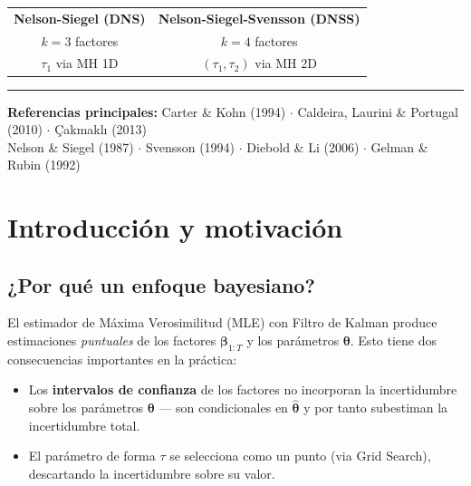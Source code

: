 \documentclass[12pt, a4paper]{article}
\theoremstyle{plain}
\theoremstyle{definition}
\theoremstyle{remark}
\newcommand{\bbet}{\bm{\beta}}
\begin{document}
\begin{titlepage}
\begin{center}
\begin{tabular}{cc}
  \textbf{Nelson-Siegel (DNS)} & \textbf{Nelson-Siegel-Svensson (DNSS)} \\[4pt]
  $k = 3$ factores & $k = 4$ factores \\[2pt]
  $\tau_1$ via MH 1D & $(\tau_1, \tau_2)$ via MH 2D \\
\end{tabular}

\vspace{2cm}
\rule{\textwidth}{0.4pt}
\vspace{0.5cm}

{\small\sffamily\color{azulclaro}
  \textbf{Referencias principales:} Carter \& Kohn (1994) $\cdot$
  Caldeira, Laurini \& Portugal (2010) $\cdot$ Çakmaklı (2013) \\
  Nelson \& Siegel (1987) $\cdot$ Svensson (1994) $\cdot$
  Diebold \& Li (2006) $\cdot$ Gelman \& Rubin (1992)
}
\end{center}
\end{titlepage}

\nopagecolor
\color{black}

\tableofcontents
\newpage

\section{Introducción y motivación}

\subsection{¿Por qué un enfoque bayesiano?}

El estimador de Máxima Verosimilitud (MLE) con Filtro de Kalman produce estimaciones
\emph{puntuales} de los factores $\bbet_{1:T}$ y los parámetros $\bm{\theta}$.
Esto tiene dos consecuencias importantes en la práctica:

\begin{itemize}[leftmargin=1.5em]
  \item Los \textbf{intervalos de confianza} de los factores no incorporan la
        incertidumbre sobre los parámetros $\bm{\theta}$ — son condicionales en
        $\hat{\bm{\theta}}$ y por tanto subestiman la incertidumbre total.
  \item El parámetro de forma $\tau$ se selecciona como un punto
        (via Grid Search), descartando la incertidumbre sobre su valor.
\end{itemize}
\end{document}
